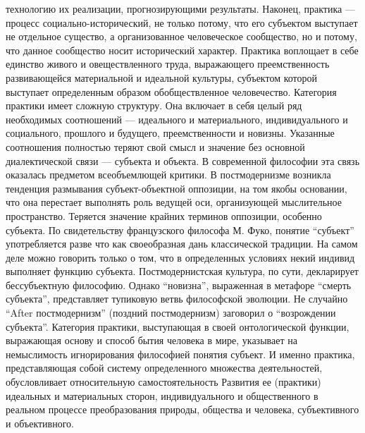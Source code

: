 \documentclass[12pt]{article}
\begin{document}
технологию  их  реализации,  прогнозирующими  результаты.  Наконец,  практика  —  процесс  социально-исторический,  не  только  потому,  что  его  субъектом  выступает  не  отдельное  существо,  а  организованное
человеческое  сообщество,  но  и  потому,  что  данное  сообщество  носит  исторический  характер.  Практика
воплощает в себе единство живого и овеществленного труда, выражающего преемственность развивающейся
материальной и идеальной культуры, субъектом которой выступает определенным образом обобществленное
человечество.
Категория практики имеет сложную структуру. Она включает в себя целый ряд необходимых соотношений —
идеального  и  материального,  индивидуального  и  социального,  прошлого  и  будущего,  преемственности  и
новизны. Указанные соотношения полностью теряют свой смысл и значение без основной диалектической
связи — субъекта и объекта.
В  современной  философии  эта  связь  оказалась  предметом  всеобъемлющей  критики.  В  постмодернизме
возникла тенденция размывания субъект-объектной оппозиции, на том якобы основании, что она перестает
выполнять роль ведущей оси, организующей мыслительное пространство. Теряется значение крайних терминов
оппозиции,  особенно  субъекта.  По  свидетельству  французского  философа  М.  Фуко,  понятие  “субъект”
употребляется разве что как своеобразная дань классической традиции. На самом деле можно говорить только о
том, что в определенных условиях некий индивид выполняет функцию субъекта. Постмодернистская культура,
по сути, декларирует бессубъектную философию. Однако “новизна”, выраженная в метафоре “смерть субъекта”,
представляет  тупиковую  ветвь  философской  эволюции.  Не  случайно  “After  постмодернизм”  (поздний
постмодернизм) заговорил о “возрождении субъекта”.
Категория практики, выступающая в своей онтологической функции, выражающая основу и способ бытия
человека в мире, указывает на немыслимость игнорирования философией понятия субъект. И именно практика,
представляющая  собой  систему  определенного  множества  деятельностей,  обусловливает  относительную
самостоятельность  Развития  ее  (практики)  идеальных  и  материальных  сторон,  индивидуального  и
общественного  в  реальном  процессе  преобразования  природы,  общества  и  человека,  субъективного  и
объективного.

\newpage
\end{document}
